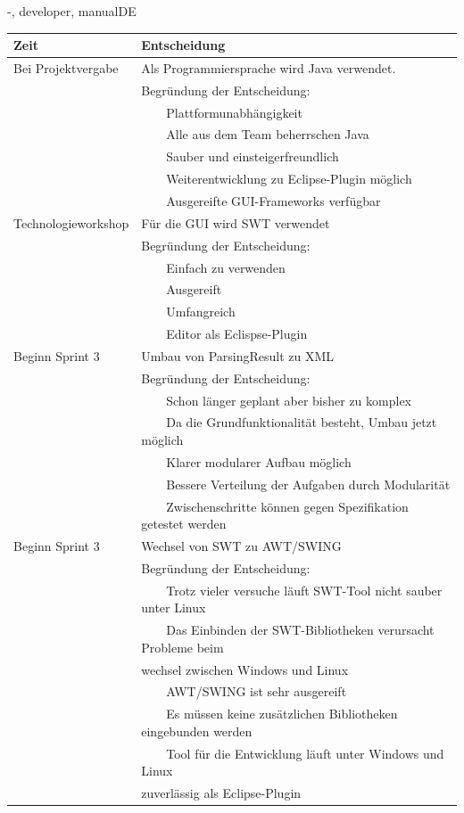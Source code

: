 \documentclass[twoside]{report}
\newcommand{\tabitem}{~~\llap{\textbullet}~~}
\begin{document}
\begin{shownto}{-, developer, manualDE}
\begin{table}[H]
\centering
\begin{tabular}{|l|l|}
\toprule
Zeit & Entscheidung \\
\midrule
Bei Projektvergabe & Als Programmiersprache wird Java verwendet.\\
& Begründung der Entscheidung:\\
&      \tabitem Plattformunabhängigkeit\\
&      \tabitem Alle aus dem Team beherrschen Java\\
&      \tabitem Sauber und einsteigerfreundlich\\
&      \tabitem Weiterentwicklung zu Eclipse-Plugin möglich\\
&      \tabitem Ausgereifte GUI-Frameworks verfügbar\\
\midrule
Technologieworkshop & Für die GUI wird SWT verwendet\\
& Begründung der Entscheidung:\\
&      \tabitem Einfach zu verwenden\\
&	   \tabitem Ausgereift\\
&	   \tabitem Umfangreich\\
&	   \tabitem Editor als Eclispse-Plugin\\
\midrule
Beginn Sprint 3 & Umbau von ParsingResult zu XML\\
& Begründung der Entscheidung:\\
&	   \tabitem Schon länger geplant aber bisher zu komplex\\
&	   \tabitem Da die Grundfunktionalität besteht, Umbau jetzt möglich\\
&	   \tabitem Klarer modularer Aufbau möglich\\
&	   \tabitem Bessere Verteilung der Aufgaben durch Modularität\\
&	   \tabitem Zwischenschritte können gegen Spezifikation getestet werden\\
\midrule
Beginn Sprint 3 & Wechsel von SWT zu AWT/SWING\\
& Begründung der Entscheidung:\\
&	   \tabitem Trotz vieler versuche läuft SWT-Tool nicht sauber unter Linux\\
&	   \tabitem Das Einbinden der SWT-Bibliotheken verursacht Probleme beim \\ &  wechsel zwischen Windows und Linux\\
&	   \tabitem AWT/SWING ist sehr ausgereift\\
&	   \tabitem Es müssen keine zusätzlichen Bibliotheken eingebunden werden\\
&	   \tabitem Tool für die Entwicklung läuft unter Windows und Linux \\ & zuverlässig als Eclipse-Plugin\\
\bottomrule
\end{tabular}
\end{table}
\nsecend


\nsecend %

\end{shownto} %
\end{document}
